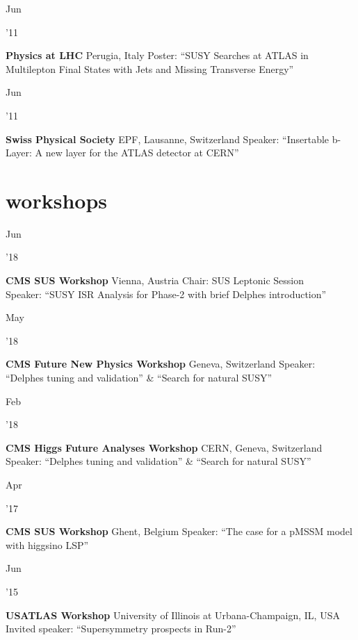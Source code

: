 \documentclass[]{cv} %
\begin{document}
\begin{entrylist}
  \entry
  {\parbox[t]{\parboxWidthOne}{Jun}\parbox[t]{\parboxWidthTwo}{\hfill '11}}
  {\textbf{Physics at LHC}}
  {Perugia, Italy}
  {Poster: ``SUSY Searches at ATLAS in Multilepton Final States with Jets and Missing Transverse Energy''}

  \entry
  {\parbox[t]{\parboxWidthOne}{Jun}\parbox[t]{\parboxWidthTwo}{\hfill '11}}
  {\textbf{Swiss Physical Society}}
  {EPF, Lausanne, Switzerland}
  {Speaker: ``Insertable b-Layer: A new layer for the ATLAS detector at CERN''}

\end{entrylist}

\section{workshops}

\begin{entrylist}

  \entry
  {\parbox[t]{\parboxWidthOne}{Jun}\parbox[t]{\parboxWidthTwo}{\hfill '18}}
  {\textbf{CMS SUS Workshop}}
  {Vienna, Austria}
  {Chair: SUS Leptonic Session\\
  Speaker: ``SUSY ISR Analysis for Phase-2 with brief Delphes introduction''}

  \entry
  {\parbox[t]{\parboxWidthOne}{May}\parbox[t]{\parboxWidthTwo}{\hfill '18}}
  {\textbf{CMS Future New Physics Workshop}}
  {Geneva, Switzerland}
  {Speaker: ``Delphes tuning and validation'' \& ``Search for natural SUSY''}

  \entry
  {\parbox[t]{\parboxWidthOne}{Feb}\parbox[t]{\parboxWidthTwo}{\hfill '18}}
  {\textbf{CMS Higgs Future Analyses Workshop}}
  {CERN, Geneva, Switzerland}
  {Speaker: ``Delphes tuning and validation'' \& ``Search for natural SUSY''}

  \entry
  {\parbox[t]{\parboxWidthOne}{Apr}\parbox[t]{\parboxWidthTwo}{\hfill '17}}
  {\textbf{CMS SUS Workshop}}
  {Ghent, Belgium}
  {Speaker: ``The case for a pMSSM model with higgsino LSP''}

  \entry
  {\parbox[t]{\parboxWidthOne}{Jun}\parbox[t]{\parboxWidthTwo}{\hfill '15}}
  {\textbf{USATLAS Workshop}}
  {University of Illinois at Urbana-Champaign, IL, USA}
  {Invited speaker: ``Supersymmetry prospects in Run-2''}

\end{entrylist}
\end{document}
